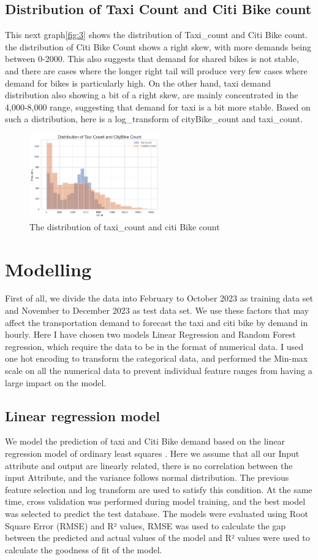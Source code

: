 \documentclass[11pt]{article}
\begin{document}
\subsection{Distribution of Taxi Count and Citi Bike count}
This next graph\ref{fig:3} shows the distribution of Taxi\_count and Citi Bike count. the distribution of Citi Bike Count shows a right skew, with more demands being between 0-2000. This also suggests that demand for shared bikes is not stable, and there are cases where the longer right tail will produce very few cases where demand for bikes is particularly high. On the other hand, taxi demand distribution also showing a bit of a right skew, are mainly concentrated in the 4,000-8,000 range, suggesting that demand for taxi is a bit more stable. Based on such a distribution, here is a log\_transform of cityBike\_count and taxi\_count.
\begin{figure}[h!]
    \centering
    \includegraphics[width=0.5\textwidth]{plot/distribution of count.png}
    \caption{The distribution of taxi\_count and citi Bike count}
    \label{fig:4}
\end{figure}


\section{Modelling}
First of all, we divide the data into February to October 2023 as training data set and November to December 2023 as test data set. We use these factors that may affect the transportation demand to forecast the taxi and citi bike by demand in hourly. Here I have chosen two models Linear Regression and Random Forest regression, which require the data to be in the format of numerical data. I used one hot encoding to transform the categorical data, and performed the Min-max scale on all the numerical data to prevent individual feature ranges from having a large impact on the model.
\subsection{Linear regression model}
We model the prediction of taxi and Citi Bike demand based on the linear regression model of ordinary least squares \cite{LR}. Here we assume that all our Input attribute and output are linearly related, there is no correlation between the input Attribute, and the variance follows normal distribution. The previous feature selection and log transform are used to satisfy this condition. At the same time, cross validation was performed during model training, and the best model was selected to predict the test database. The models were evaluated using Root Square Error (RMSE) and R² values, RMSE was used to calculate the gap between the predicted and actual values of the model and R² values were used to calculate the goodness of fit of the model.
\end{document}
